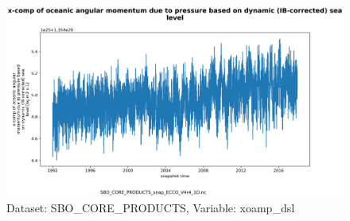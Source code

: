 \begin{figure}[H]
\centering
\includegraphics[scale=0.55]{../images/plots/v4r4/oneD_plots/SBO_Core_Products/xoamp_dsl.png}
\caption{Dataset: SBO\_CORE\_PRODUCTS, Variable: xoamp\_dsl}
\label{tab:table-SBO_CORE_PRODUCTS_xoamp_dsl-Plot}
\end{figure}
\newpage
\pagebreak

